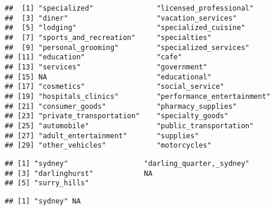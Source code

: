 \documentclass[
]{article}
\newenvironment{Shaded}{\begin{snugshade}}{\end{snugshade}}
\newcommand{\FunctionTok}[1]{\textcolor[rgb]{0.13,0.29,0.53}{\textbf{#1}}}
\newcommand{\NormalTok}[1]{#1}
\newcommand{\SpecialCharTok}[1]{\textcolor[rgb]{0.81,0.36,0.00}{\textbf{#1}}}
\begin{document}
\begin{verbatim}
##  [1] "specialized"               "licensed_professional"    
##  [3] "diner"                     "vacation_services"        
##  [5] "lodging"                   "specialized_cuisine"      
##  [7] "sports_and_recreation"     "specialties"              
##  [9] "personal_grooming"         "specialized_services"     
## [11] "education"                 "cafe"                     
## [13] "services"                  "government"               
## [15] NA                          "educational"              
## [17] "cosmetics"                 "social_service"           
## [19] "hospitals_clinics"         "performance_entertainment"
## [21] "consumer_goods"            "pharmacy_supplies"        
## [23] "private_transportation"    "specialty_goods"          
## [25] "automobile"                "public_transportation"    
## [27] "adult_entertainment"       "supplies"                 
## [29] "other_vehicles"            "motorcycles"
\end{verbatim}

\begin{Shaded}
\end{Shaded}

\begin{verbatim}
## [1] "sydney"                  "darling_quarter,_sydney"
## [3] "darlinghurst"            NA                       
## [5] "surry_hills"
\end{verbatim}

\begin{Shaded}
\end{Shaded}

\begin{verbatim}
## [1] "sydney" NA
\end{verbatim}

\begin{Shaded}
\end{Shaded}
\end{document}
